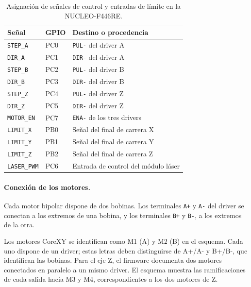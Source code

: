 \documentclass[blue,fullpaper]{ludusofficial}  %
\begin{document}
\begin{table}[htbp]
    \centering
    \small
    \caption{Asignación de señales de control y entradas
    de límite en la NUCLEO-F446RE.}
    \label{tab:senales-electricas}
    \begin{tabular}{lll}
        \hline
        Señal & GPIO & Destino o procedencia \\
        \hline
        \texttt{STEP\_A}    & PC0 & \texttt{PUL-} del driver A \\
        \texttt{DIR\_A}     & PC1 & \texttt{DIR-} del driver A \\
        \texttt{STEP\_B}    & PC2 & \texttt{PUL-} del driver B \\
        \texttt{DIR\_B}     & PC3 & \texttt{DIR-} del driver B \\
        \texttt{STEP\_Z}    & PC4 & \texttt{PUL-} del driver Z \\
        \texttt{DIR\_Z}     & PC5 & \texttt{DIR-} del driver Z \\
        \texttt{MOTOR\_EN}  & PC7 & \texttt{ENA-} de los tres drivers \\
        \texttt{LIMIT\_X}   & PB0 & Señal del final de carrera X \\
        \texttt{LIMIT\_Y}   & PB1 & Señal del final de carrera Y \\
        \texttt{LIMIT\_Z}   & PB2 & Señal del final de carrera Z \\
        \texttt{LASER\_PWM} & PC6 & Entrada de control del módulo láser \\
        \hline
    \end{tabular}
\end{table}

\paragraph{Conexión de los motores.}
Cada motor bipolar dispone de dos bobinas.
Los terminales \texttt{A+} y \texttt{A-} del driver
se conectan a los extremos de una bobina,
y los terminales \texttt{B+} y \texttt{B-},
a los extremos de la otra.

Los motores CoreXY se identifican como M1 (A) y M2 (B) en el esquema. Cada uno dispone de un driver; estas letras deben distinguirse de A+/A- y B+/B-, que identifican las bobinas. Para el eje Z,
el firmware documenta dos motores conectados
en paralelo a un mismo driver. El esquema muestra las ramificaciones de cada salida hacia M3 y M4, correspondientes a los dos motores de Z.
\end{document}
